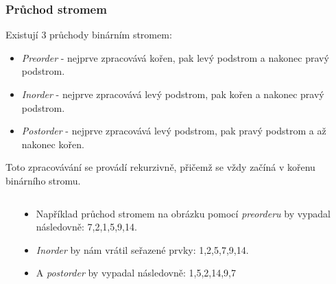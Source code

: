 \documentclass[10pt,xcolor=pdflatex,hyperref={unicode}]{beamer}
\begin{document}
\begin{frame}\frametitle{Průchod stromem}

    Existují 3 průchody binárním stromem:
    \begin{itemize}
        \item \emph{Preorder} - nejprve zpracovává kořen, pak levý podstrom a nakonec pravý podstrom.
        \item \emph{Inorder} - nejprve zpracovává levý podstrom, pak kořen a nakonec pravý podstrom.
        \item \emph{Postorder} - nejprve zpracovává levý podstrom, pak pravý podstrom a až nakonec kořen.
    \end{itemize}

    Toto zpracovávání se provádí rekurzivně, přičemž se vždy začíná v kořenu binárního stromu.
    \begin{columns}
        \begin{column}{0.35\textwidth}
            \label{imgPreorder}
        \end{column}
        \begin{column}{0.65\textwidth}
            \begin{itemize}
            \item Například průchod stromem na obrázku pomocí \emph{preorderu} by vypadal následovně: 7,2,1,5,9,14.
            
            \item \emph{Inorder} by nám vrátil seřazené prvky: 1,2,5,7,9,14.
            
            \item A \emph{postorder} by vypadal následovně: 1,5,2,14,9,7
            \end{itemize}
        \end{column}
    \end{columns}
    
\end{frame}
\end{document}
